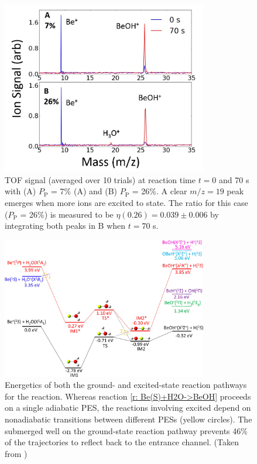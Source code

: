 \begin{figure}
	\centering
	\includegraphics[width=0.8\textwidth]{images/Be_H2O_TOF.png}
	\caption{TOF signal (averaged over 10 trials) at reaction time $t = 0$ and 70 s with (A) $P_{\text{P}}$ = 7\% (A) and (B) $P_{\text{P}}$ = 26\%. A clear $m/z = 19$ peak emerges when more  ions are excited to  state. The  ratio for this case ($P_{\text{P}}$ = 26\%) is measured to be $\eta(0.26) = 0.039 \pm 0.006$ by integrating both peaks in B when $t = 70$ s.}
	\label{fig: Be+H2O TOF}
\end{figure}

\begin{figure}
	\centering
	\includegraphics[width=0.8\textwidth]{images/Be_H2O_PES.jpeg}
	\caption{Energetics of both the ground- and excited-state reaction pathways for the  reaction. Whereas reaction \ref{r: Be(S)+H2O->BeOH} proceeds on a single adiabatic PES, the reactions involving excited  depend on nonadiabatic transitions between different PESs (yellow circles). The submerged well on the ground-state reaction pathway prevents 46\% of the trajectories to reflect back to the entrance channel. (Taken from \cite{Yang2018})}
	\label{fig: Be+H2O PES}
\end{figure}

